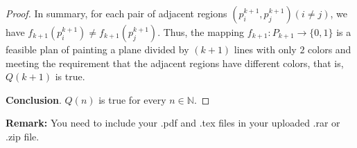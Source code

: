 \documentclass[12pt,a4paper]{article}
\theoremstyle{definition}
\begin{document}
\begin{enumerate}
\begin{proof}
        In summary, for each pair of adjacent regions $(p_i^{k+1}, p_j^{k+1}) (i \neq j)$, we have $f_{k+1}(p_i^{k+1}) \ne f_{k+1}(p_j^{k+1})$. Thus, the mapping $f_{k+1}: P_{k+1} \rightarrow \{0, 1\}$ is a feasible plan of painting a plane divided by $(k+1)$ lines with only $2$ colors and meeting the requirement that the adjacent regions have different colors, that is, $Q(k+1)$ is true.

        \textbf{\color{blue}Conclusion}. $Q(n)$ is true for every $n \in \mathbb{N}$.
    \end{proof}

\end{enumerate}

\vspace{20pt}

\textbf{Remark:} You need to include your .pdf and .tex files in your uploaded .rar or .zip file.

\end{document}
